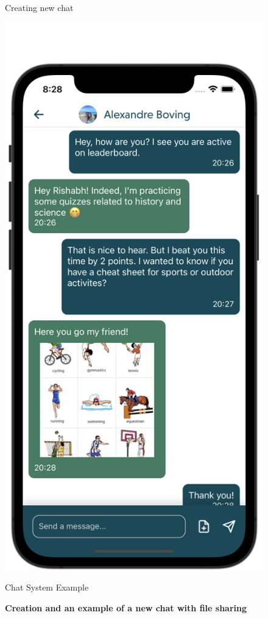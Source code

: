 \begin{figure}[H]
\begin{minipage}[b]{0.43\linewidth}
        \caption{Creating new chat}
    \end{minipage}
    \hspace{0.1\linewidth}
    \begin{minipage}[b]{0.43\linewidth}
        \centering
        \includegraphics[width=\linewidth]{Images/Chat Example.png}
        \caption{Chat System Example}
    \end{minipage}
    \vspace{0.5cm}
    \caption{\textbf{Creation and an example of a new chat with file sharing}}
\end{figure}

